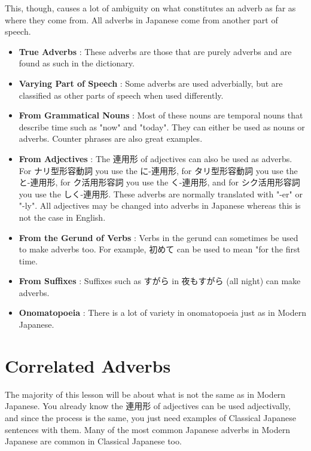 \par{This, though, causes a lot of ambiguity on what constitutes an adverb  as far as where they come from. All adverbs in Japanese come from  another part of speech. }

\begin{itemize}

\item \textbf{True Adverbs }: These adverbs are those that are purely adverbs and are found as such in the dictionary. 
\item \textbf{Varying Part of Speech }:  Some adverbs are used adverbially, but are classified as other parts of  speech when used differently. 
\item \textbf{From Grammatical Nouns }:  Most of these nouns are temporal nouns that describe time such as "now"   and "today". They can either be used as nouns or adverbs. Counter   phrases are also great examples. 
\item \textbf{From Adjectives }: The 連用形 of adjectives can also be used as adverbs. For ナリ型形容動詞  you use the に-連用形, for タリ型形容動詞 you use the と-連用形, for ク活用形容詞 you use  the く-連用形, and for シク活用形容詞 you use the しく-連用形. These adverbs are normally translated with  "-er" or  "-ly". All adjectives may be changed into adverbs in Japanese  whereas  this is not the case in English. 
\item \textbf{From the Gerund of Verbs }: Verbs in the gerund can sometimes be used to make adverbs too. For example, 初めて can be used to mean "for the first time. 
\item \textbf{From Suffixes }: Suffixes such as すがら in 夜もすがら (all night) can make adverbs. 
\item \textbf{Onomatopoeia }:  There is a lot of variety in onomatopoeia just as in Modern Japanese. \hfill\break

\end{itemize}
      
\section{Correlated Adverbs}
 
\par{The majority of this lesson will be about what is not the same as in Modern Japanese. You already know the 連用形 of adjectives can be used adjectivally, and since the process is the same, you just need examples of Classical Japanese sentences with them. Many of the most common Japanese adverbs in Modern Japanese are common in Classical Japanese too. }

